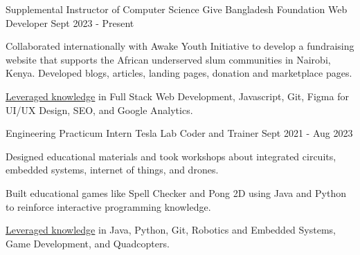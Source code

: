 

\begin{cventries}

  \vspace{-0.3mm}
\cventryalt
    {Supplemental Instructor of Computer Science} %
    {Give Bangladesh Foundation} %
    {Web Developer} %
    {Sept 2023 - Present} %
    {
      \begin{cvitems}
      \item {Collaborated internationally with Awake Youth Initiative to develop a fundraising website that supports the African underserved slum communities in Nairobi, Kenya. 
      Developed blogs, articles, landing pages, donation and marketplace pages.}
      \item {\underline{Leveraged knowledge} in Full Stack Web Development, Javascript, Git, Figma for UI/UX Design, SEO, and Google Analytics.}
      \end{cvitems}
    }

    \vspace{-1.0mm}
\cventryalt
    {Engineering Practicum Intern} %
    {Tesla Lab} %
    {Coder and Trainer} %
    {Sept 2021 - Aug 2023} %
    {
      \begin{cvitems}
        \item {Designed educational materials and took workshops about integrated circuits, embedded systems, internet of things, and drones.}
        \item {Built educational games like Spell Checker and Pong 2D using Java and Python to reinforce interactive programming knowledge.}
        \item {\underline{Leveraged knowledge} in Java, Python, Git, Robotics and Embedded Systems, Game Development, and Quadcopters.}
      \end{cvitems}
    }

\end{cventries}
